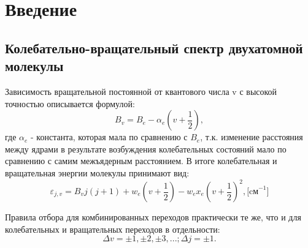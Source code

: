 \documentclass{article}
\begin{document}
\section{Введение}
\subsection{Колебательно-вращательный спектр двухатомной молекулы}\;
\par Зависимость вращательной постоянной от квантового числа v с высокой точностью описывается формулой:
\[B_v = B_e - \alpha_e\left(v+\frac{1}{2}\right),\]
где $\alpha_e$ - константа, которая мала по сравнению с $B_e$, т.к. изменение расстояния между ядрами в результате возбуждения колебательных состояний мало по сравнению с самим межъядерным расстоянием. В итоге колебательная и вращательная энергии молекулы принимают вид:
\[\varepsilon_{j,v} = B_v j(j+1) + w_e \left(v+\frac{1}{2}\right) - w_ex_e\left(v+\frac{1}{2}\right)^2, \text{[cм}^{-1}\text{]} \]
\par Правила отбора для комбинированных переходов практически те же, что и для колебательных и вращательных переходов в отдельности:
\[\Delta v = \pm1,\pm2,\pm3,...;  \Delta j = \pm1.\]
\end{document}
